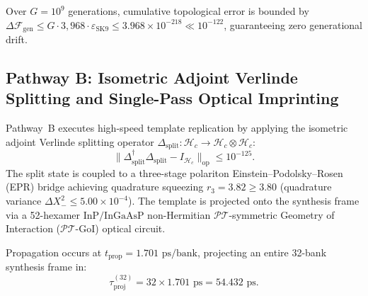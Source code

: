 \documentclass[11pt,onecolumn]{article}
\begin{document}
Over $G = 10^9$ generations, cumulative topological error is bounded by $\Delta\mathcal{F}_{\text{gen}} \le G \cdot 3{,}968 \cdot \varepsilon_{\text{SK9}} \le 3.968 \times 10^{-218} \ll 10^{-122}$, guaranteeing zero generational drift.

\FloatBarrier
\subsection{Pathway B: Isometric Adjoint Verlinde Splitting and Single-Pass Optical Imprinting}
Pathway~B executes high-speed template replication by applying the isometric adjoint Verlinde splitting operator $\Delta_{\text{split}} : \mathcal{H}_c \to \mathcal{H}_c \otimes \mathcal{H}_c$:
\begin{equation}
\|\Delta_{\text{split}}^\dagger \Delta_{\text{split}} - I_{\mathcal{H}_c}\|_{\text{op}} \le 10^{-125}.
\label{eq:verlinde_splitting_isometry}
\end{equation}
The split state is coupled to a three-stage polariton Einstein--Podolsky--Rosen (EPR) bridge achieving quadrature squeezing $r_3 = 3.82 \ge 3.80$ (quadrature variance $\Delta X_-^2 \le 5.00 \times 10^{-4}$). The template is projected onto the synthesis frame via a 52-hexamer $\text{InP/InGaAsP}$ non-Hermitian $\mathcal{PT}$-symmetric Geometry of Interaction ($\mathcal{PT}$-GoI) optical circuit.

Propagation occurs at $t_{\text{prop}} = 1.701\text{ ps/bank}$, projecting an entire 32-bank synthesis frame in:
\begin{equation}
\tau_{\text{proj}}^{(32)} = 32 \times 1.701\text{ ps} = 54.432\text{ ps}.
\label{eq:pt_goi_32bank_latency}
\end{equation}

\FloatBarrier
\end{document}
